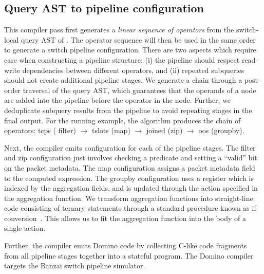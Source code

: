 \subsection{Query AST to pipeline configuration}
\label{sec:pipeline-layout}

This compiler pass first generates a {\em linear sequence of operators} from the
switch-local query AST of . The operator sequence
will then be used in the same order to generate a switch pipeline
configuration. There are two aspects which require care when constructing a
pipeline structure: (i) the pipeline should respect read-write dependencies
between different operators, and (ii) repeated subqueries should not create
additional pipeline stages. We generate a chain through a post-order traversal
of the query AST, which guarantees that the operands of a node are added into
the pipeline before the operator in the node. Further, we deduplicate subquery
results from the pipeline to avoid repeating stages in the final output. For the
running example, the algorithm produces the chain of operators: {\ct tcps} ({\ct
  filter}) $\rightarrow$ {\ct tslots} ({\ct map}) $\rightarrow$ {\ct joined}
({\ct zip}) $\rightarrow$ {\ct oos} ({\ct groupby}).

Next, the compiler emits \pfs configuration for each of the pipeline stages. The
{\ct filter} and {\ct zip} configuration just involves checking a predicate and
setting a ``valid'' bit on the packet metadata. The {\ct map} configuration
assigns a packet metadata field to the computed expression. The {\ct groupby}
configuration uses a register which is indexed by the aggregation fields, and is
updated through the action specified in the aggregation function. We transform
\TheSystem aggregation functions into straight-line code consisting of ternary
statements through a standard procedure known as
if-conversion~\cite{if-conversion}. This allows us to fit the aggregation
function into the body of a single \pfs action.

Further, the \TheSystem compiler emits Domino code by collecting C-like code
fragments from all pipeline stages together into a stateful program. The Domino
compiler targets the Banzai switch pipeline simulator.

